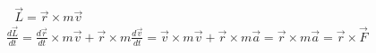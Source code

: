 \documentclass{article}
\begin{document}
\begin{CJK}{UTF8}{gkai}
\end{CJK}
\begin{CJK}{UTF8}{gbsn}
\textcolor[rgb]{1,0,0}{\begin{math} \end{math} \begin{math}			\end{math}}
\begin{math}			
	\vec{L}=\vec{r}\times m \vec{v}
\end{math}\\[0.1cm]

\begin{math}
	\frac{d \vec{L}}{dt}
	=\frac{d \vec{r}}{dt}\times{}m \vec{v}+\vec{r}\times{}m \frac{d \vec{v}}{dt}
	=\vec{v}\times{}m \vec{v}+\vec{r}\times{}m \vec{a}
	=\vec{r}\times{}m \vec{a}
	=\vec{r}\times{}\vec{F}
\end{math}\\[0.1cm]

\begin{math}	
\end{math}


\end{CJK}
\end{document}
